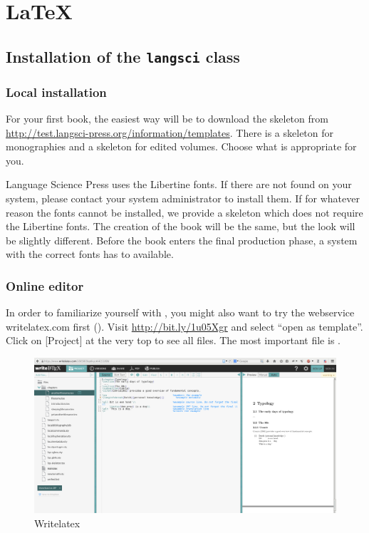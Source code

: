 \chapter{\LaTeX}

\section{Installation of the \texttt{langsci} class}
\subsection{Local installation}
For your first book, the easiest way will be to download the skeleton from \url{http://test.langsci-press.org/information/templates}.
There is a skeleton for monographies and a skeleton for edited volumes. Choose what is appropriate for you.
 

Language Science Press uses the Libertine fonts. If there are not found on your system, please contact your system administrator to install them. If for whatever reason the fonts cannot be installed, we provide a skeleton which does not require the Libertine fonts. The creation of the book will be the same, but the look will be slightly different. Before the book enters the final production phase, a system with the correct fonts has to available. 

\subsection{Online editor}
In order to familiarize yourself with \latex, you might also want to try the webservice writelatex.com first (). Visit \url{http://bit.ly/1u05Xgr} and select ``open as template''. Click on [Project] at the very top to see all files. The most important file is .

\begin{figure}
 \includegraphics[width=\textwidth]{writelatex.png}
  \caption{Writelatex}
  \label{fig:latex:writelatex}
\end{figure}

